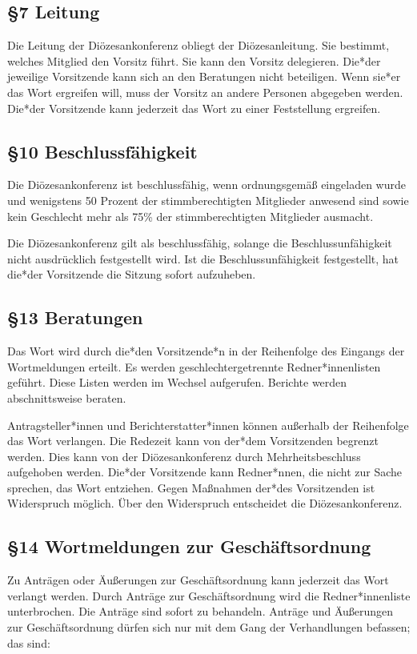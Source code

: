 \documentclass[12pt]{report}
\begin{document}
\begin{flushleft}
\subsection*{§7 Leitung}
Die Leitung der Diözesankonferenz obliegt der Diözesanleitung. Sie bestimmt, welches Mitglied den Vorsitz
führt. Sie kann den Vorsitz delegieren. {\color{red}Die*der} jeweilige Vorsitzende kann sich an den Beratungen nicht beteiligen.
Wenn {\color{red}sie*er} das Wort ergreifen will, muss der Vorsitz an andere Personen abgegeben werden.
{\color{red} Die*der} Vorsitzende kann jederzeit das Wort zu einer Feststellung ergreifen.


\subsection*{§10 Beschlussfähigkeit}
Die Diözesankonferenz ist beschlussfähig, wenn ordnungsgemäß eingeladen wurde und wenigstens 50 Prozent
der stimmberechtigten Mitglieder anwesend sind sowie {\color{red}kein Geschlecht mehr als 75\% der stimmberechtigten Mitglieder ausmacht}.

Die Diözesankonferenz gilt als beschlussfähig, solange die Beschlussunfähigkeit nicht ausdrücklich
festgestellt wird. Ist die Beschlussunfähigkeit festgestellt, hat {\color{red}die*der} Vorsitzende die Sitzung sofort aufzuheben.


\subsection*{§13 Beratungen}
Das Wort wird durch {\color{red}die*den Vorsitzende*n} in der Reihenfolge des Eingangs der Wortmeldungen erteilt.
{\color{red} Es werden geschlechtergetrennte Redner*innenlisten geführt. Diese Listen werden im Wechsel aufgerufen.}
Berichte werden abschnittsweise beraten.

{\color{red}Antragsteller*innen und Berichterstatter*innen} können außerhalb der Reihenfolge das Wort verlangen. Die Redezeit
kann von {\color{red}der*dem} Vorsitzenden begrenzt werden. Dies kann von der Diözesankonferenz durch Mehrheitsbeschluss
aufgehoben werden. {\color{red}Die*der} Vorsitzende kann {\color{red}Redner*nnen}, die nicht zur Sache sprechen, das
Wort entziehen. Gegen Maßnahmen {\color{red}der*des} Vorsitzenden ist Widerspruch möglich. Über den Widerspruch
entscheidet die Diözesankonferenz.

\subsection*{§14 Wortmeldungen zur Geschäftsordnung}
Zu Anträgen oder Äußerungen zur Geschäftsordnung kann jederzeit das Wort verlangt werden.
Durch Anträge zur Geschäftsordnung wird die {\color{red}Redner*innenliste} unterbrochen. Die Anträge sind sofort zu
behandeln. Anträge und Äußerungen zur Geschäftsordnung dürfen sich nur mit dem Gang der Verhandlungen
befassen; das sind:


\end{flushleft}
\end{document}
